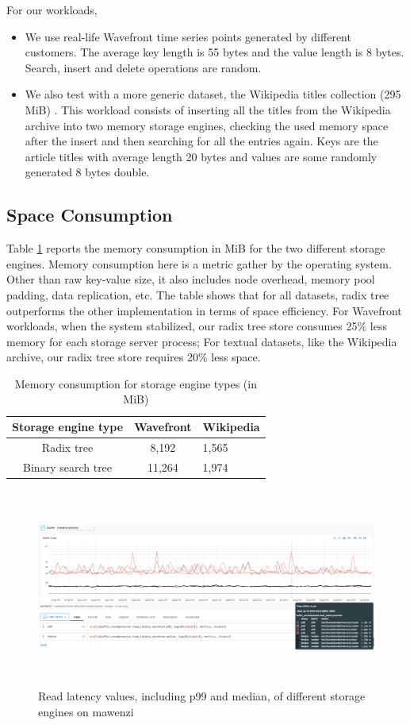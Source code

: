 \documentclass[sigplan,screen,nonacm]{acmart}
\begin{document}
For our workloads, 
\begin{itemize}
    \item We use real-life Wavefront time series points generated by different customers. The average key length is 55 bytes and the value length is 8 bytes. Search, insert and delete operations are random. 
    \item We also test with a more generic dataset, the Wikipedia titles collection (295 MiB) \cite{wikidatasets}. This workload consists of inserting all the titles from the Wikipedia archive into two memory storage engines, checking the used memory space after the insert and then searching for all the entries again. Keys are the article titles  with average length 20 bytes and values are some randomly generated 8 bytes double. 
\end{itemize}

\subsection{Space Consumption}
Table \ref{tab:memory-usage} reports the memory consumption in MiB for the two different storage engines. Memory consumption here is a metric gather by the operating system. Other than raw key-value size, it also includes node overhead, memory pool padding, data replication, etc. The table shows that for all datasets, radix tree outperforms the other implementation in terms of space efficiency. For Wavefront workloads, when the system stabilized, our radix tree store consumes 25\% less memory for each storage server process; For textual datasets, like the Wikipedia archive, our radix tree store requires 20\% less space. 
\begin{table}[h]
  \caption{Memory consumption for storage engine types (in MiB)}
  \begin{tabular}{ccl}
    \toprule
    Storage engine type&Wavefront&Wikipedia\\
    \midrule
    Radix tree & 8,192 & 1,565\\
    Binary search tree & 11,264 & 1,974\\
    \bottomrule
  \end{tabular}
  \label{tab:memory-usage}
\end{table}

\begin{figure}[t]
  \centering
  \includegraphics[width=\linewidth, height=6.5cm]{pic/read latency.png}
  \setlength{\belowcaptionskip}{-8pt} 
  \caption{Read latency values, including p99 and median, of different storage engines on mawenzi}
  \label{fig:read-latency}
\end{figure}
\end{document}
